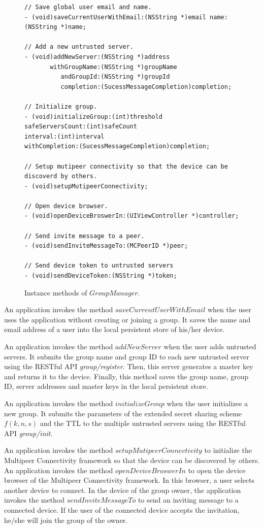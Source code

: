 \documentclass[a4paper,11pt]{report}
\begin{document}
\begin{figure}
\begin{lstlisting}[frame=none language=Objective-C] 
// Save global user email and name.
- (void)saveCurrentUserWithEmail:(NSString *)email name:(NSString *)name;

// Add a new untrusted server.
- (void)addNewServer:(NSString *)address
       withGroupName:(NSString *)groupName
          andGroupId:(NSString *)groupId
          completion:(SucessMessageCompletion)completion;

// Initialize group.
- (void)initializeGroup:(int)threshold
safeServersCount:(int)safeCount
interval:(int)interval
withCompletion:(SucessMessageCompletion)completion;

// Setup mutipeer connectivity so that the device can be discoverd by others.
- (void)setupMutipeerConnectivity;

// Open device browser.
- (void)openDeviceBroswerIn:(UIViewController *)controller;

// Send invite message to a peer.
- (void)sendInviteMessageTo:(MCPeerID *)peer;

// Send device token to untrusted servers
- (void)sendDeviceToken:(NSString *)token;	
\end{lstlisting}
\caption{Instance methods of $GroupManager$.}
\label{fig:group_manager}
\end{figure}

An application invokes the method $saveCurrentUserWithEmail$ when the user uses the application without creating or joining a group.
It saves the name and email address of a user into the local persistent store of his/her device.

An application invokes the method $addNewServer$ when the user adds untrusted servers. 
It submits the group name and group ID to each new untrusted server using the RESTful API \emph{group/register}.
Then, this server generates a master key and returns it to the device.
Finally, this method saves the group name, group ID, server addresses and master keys in the local persistent store.

An application invokes the method $initializeGroup$  when the user initializes a new group.
It submits the parameters of the extended secret sharing scheme $f(k, n, s)$ and the TTL to the multiple untrusted servers using the RESTful API \emph{group/init}.

An application invokes the method $setupMutipeerConnectivity$ to initialize the Multipeer Connectivity framework so that the device can be discovered by others.
An application invokes the method $openDeviceBroswerIn$ to open the device browser of the Multipeer Connectivity framework.
In this browser, a user selects another device to connect.
In the device of the group owner, the application invokes the method $sendInviteMessageTo$ to send an inviting message to a connected device.
If the user of the connected device accepts the invitation, he/she will join the group of the owner.
\end{document}
